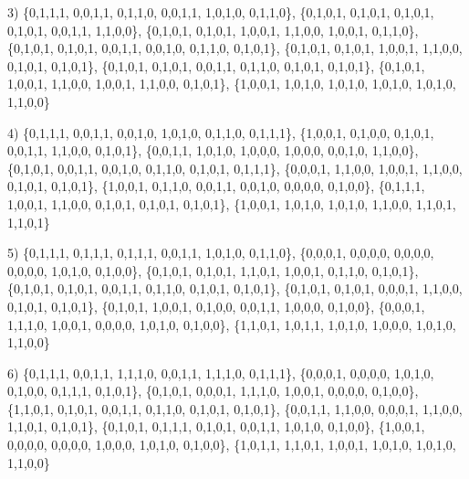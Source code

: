 3) \{0,1,1,1, 0,0,1,1, 0,1,1,0, 0,0,1,1, 1,0,1,0, 0,1,1,0\}, \{0,1,0,1, 0,1,0,1, 0,1,0,1, 0,1,0,1, 0,0,1,1, 1,1,0,0\}, \{0,1,0,1, 0,1,0,1, 1,0,0,1, 1,1,0,0, 1,0,0,1, 0,1,1,0\}, \{0,1,0,1, 0,1,0,1, 0,0,1,1, 0,0,1,0, 0,1,1,0, 0,1,0,1\}, \{0,1,0,1, 0,1,0,1, 1,0,0,1, 1,1,0,0, 0,1,0,1, 0,1,0,1\}, \{0,1,0,1, 0,1,0,1, 0,0,1,1, 0,1,1,0, 0,1,0,1, 0,1,0,1\}, \{0,1,0,1, 1,0,0,1, 1,1,0,0, 1,0,0,1, 1,1,0,0, 0,1,0,1\}, \{1,0,0,1, 1,0,1,0, 1,0,1,0, 1,0,1,0, 1,0,1,0, 1,1,0,0\}

4) \{0,1,1,1, 0,0,1,1, 0,0,1,0, 1,0,1,0, 0,1,1,0, 0,1,1,1\}, \{1,0,0,1, 0,1,0,0, 0,1,0,1, 0,0,1,1, 1,1,0,0, 0,1,0,1\}, \{0,0,1,1, 1,0,1,0, 1,0,0,0, 1,0,0,0, 0,0,1,0, 1,1,0,0\}, \{0,1,0,1, 0,0,1,1, 0,0,1,0, 0,1,1,0, 0,1,0,1, 0,1,1,1\}, \{0,0,0,1, 1,1,0,0, 1,0,0,1, 1,1,0,0, 0,1,0,1, 0,1,0,1\}, \{1,0,0,1, 0,1,1,0, 0,0,1,1, 0,0,1,0, 0,0,0,0, 0,1,0,0\}, \{0,1,1,1, 1,0,0,1, 1,1,0,0, 0,1,0,1, 0,1,0,1, 0,1,0,1\}, \{1,0,0,1, 1,0,1,0, 1,0,1,0, 1,1,0,0, 1,1,0,1, 1,1,0,1\}

5) \{0,1,1,1, 0,1,1,1, 0,1,1,1, 0,0,1,1, 1,0,1,0, 0,1,1,0\}, \{0,0,0,1, 0,0,0,0, 0,0,0,0, 0,0,0,0, 1,0,1,0, 0,1,0,0\}, \{0,1,0,1, 0,1,0,1, 1,1,0,1, 1,0,0,1, 0,1,1,0, 0,1,0,1\}, \{0,1,0,1, 0,1,0,1, 0,0,1,1, 0,1,1,0, 0,1,0,1, 0,1,0,1\}, \{0,1,0,1, 0,1,0,1, 0,0,0,1, 1,1,0,0, 0,1,0,1, 0,1,0,1\}, \{0,1,0,1, 1,0,0,1, 0,1,0,0, 0,0,1,1, 1,0,0,0, 0,1,0,0\}, \{0,0,0,1, 1,1,1,0, 1,0,0,1, 0,0,0,0, 1,0,1,0, 0,1,0,0\}, \{1,1,0,1, 1,0,1,1, 1,0,1,0, 1,0,0,0, 1,0,1,0, 1,1,0,0\}

6) \{0,1,1,1, 0,0,1,1, 1,1,1,0, 0,0,1,1, 1,1,1,0, 0,1,1,1\}, \{0,0,0,1, 0,0,0,0, 1,0,1,0, 0,1,0,0, 0,1,1,1, 0,1,0,1\}, \{0,1,0,1, 0,0,0,1, 1,1,1,0, 1,0,0,1, 0,0,0,0, 0,1,0,0\}, \{1,1,0,1, 0,1,0,1, 0,0,1,1, 0,1,1,0, 0,1,0,1, 0,1,0,1\}, \{0,0,1,1, 1,1,0,0, 0,0,0,1, 1,1,0,0, 1,1,0,1, 0,1,0,1\}, \{0,1,0,1, 0,1,1,1, 0,1,0,1, 0,0,1,1, 1,0,1,0, 0,1,0,0\}, \{1,0,0,1, 0,0,0,0, 0,0,0,0, 1,0,0,0, 1,0,1,0, 0,1,0,0\}, \{1,0,1,1, 1,1,0,1, 1,0,0,1, 1,0,1,0, 1,0,1,0, 1,1,0,0\} 